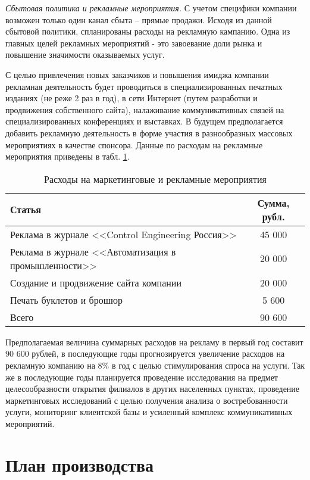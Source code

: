 \textit{Сбытовая политика и рекламные мероприятия.} С учетом специфики компании возможен только один канал сбыта -- прямые продажи. Исходя из данной сбытовой политики, спланированы расходы на рекламную кампанию.
Одна из главных целей рекламных мероприятий - это завоевание доли рынка и повышение значимости оказываемых услуг.

С целью привлечения новых заказчиков и повышения имиджа компании рекламная деятельность будет проводиться в специализированных печатных изданиях (не реже 2 раз в год), в сети Интернет (путем разработки и продвижения собственного сайта), налаживание коммуникативных связей на специализированных конференциях и выставках. В будущем предполагается добавить рекламную деятельность в форме участия в разнообразных массовых мероприятиях в качестве спонсора. Данные по расходам на рекламные мероприятия приведены в табл. \ref{table:plan_adv}.
\begin{table}[h!]
	\centering
	\caption{Расходы на маркетинговые и рекламные мероприятия}
	\begin{tabular}{|l|c|}
		\hline
		Статья & Сумма, рубл. \\
		\hline
		Реклама в журнале <<Control Engineering Россия>>  & 45 000 \\
		\hline
		Реклама в журнале <<Автоматизация в промышленности>> & 20 000 \\
		\hline
		Создание и продвижение сайта компании  & 20 000 \\
		\hline
		Печать буклетов и брошюр & 5 600 \\
		\hline
		Всего & 90 600\\
		\hline
	\end{tabular}
	\label{table:plan_adv}
\end{table}

Предполагаемая величина суммарных расходов на рекламу в первый год составит 90 600 рублей, в последующие годы прогнозируется увеличение расходов на рекламную компанию на 8\% в год с целью стимулирования спроса на услуги.
Так же в последующие годы планируется проведение исследования на предмет целесообразности открытия филиалов в других населенных пунктах, проведение маркетинговых исследований с целью получения анализа о востребованности услуги, мониторинг клиентской базы и усиленный комплекс коммуникативных мероприятий.


\section{План производства}

